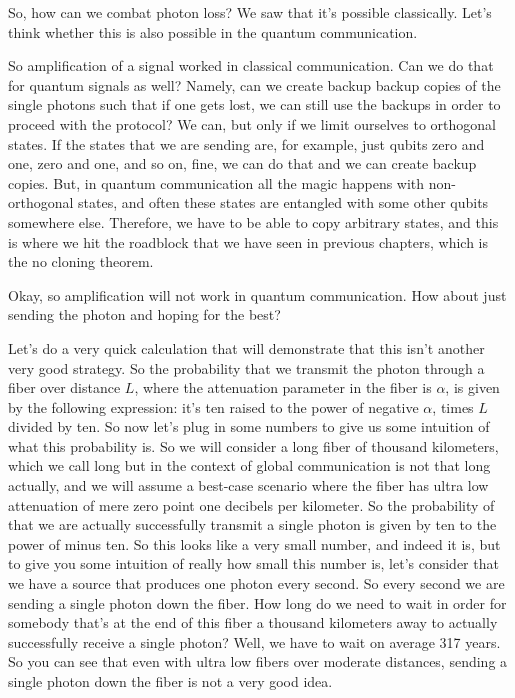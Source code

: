 So, how can we combat photon loss? We saw that it's possible classically. Let's think whether this is also possible in the quantum communication.

So amplification of a signal worked in classical communication. Can we do that for quantum signals as well? Namely, can we create backup backup copies of the single photons such that if one gets lost, we can still use the backups in order to proceed with the protocol? We can, but only if we limit ourselves to orthogonal states. If the states that we are sending are, for example, just qubits zero and one, zero and one, and so on, fine, we can do that and we can create backup copies. But, in quantum communication all the magic happens with non-orthogonal states, and often these states are entangled with some other qubits somewhere else. Therefore, we have to be able to copy arbitrary states, and this is where we hit the roadblock that we have seen in previous chapters, which is the no cloning theorem.

Okay, so amplification will not work in quantum communication. How about just sending the photon and hoping for the best?

Let's do a very quick calculation that will demonstrate that this isn't another very good strategy. So the probability that we transmit the photon through a fiber over distance $L$, where the attenuation parameter in the fiber is $\alpha$, is given by the following expression: it's ten raised to the power of negative $\alpha$, times $L$ divided by ten. So now let's plug in some numbers to give us some intuition of what this probability is. So we will consider a long fiber of thousand kilometers, which we call long but in the context of global communication is not that long actually, and we will assume a best-case scenario where the fiber has ultra low attenuation of mere zero point one decibels per kilometer. So the probability of that we are actually successfully transmit a single photon is given by ten to the power of minus ten. So this looks like a very small number, and indeed it is, but to give you some intuition of really how small this number is, let's consider that we have a source that produces one photon every second. So every second we are sending a single photon down the fiber. How long do we need to wait in order for somebody that's at the end of this fiber a thousand kilometers away to actually successfully receive a single photon? Well, we have to wait on average 317 years. So you can see that even with ultra low fibers over moderate distances, sending a single photon down the fiber is not a very good idea.

